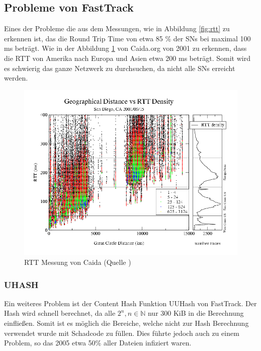 
\subsection{Probleme von FastTrack}
\label{subsec:probT}

Eines der Probleme die aus dem Messungen, wie in Abbildung \ref{fig:rtt} zu erkennen ist, das die Round Trip Time von etwa 85 \% der SNs bei maximal 100 ms beträgt.
Wie in der Abbildung \ref{fig:rttcaida} von Caida.org von 2001 \cite{caida} zu erkennen, dass die RTT von Amerika nach Europa und Asien etwa 200 ms beträgt.
Somit wird es schwierig das ganze Netzwerk zu durchsuchen, da nicht alle SNs erreicht werden.

\begin{figure}
\includegraphics[scale=0.3]{gfx/dist_density_rie_20010513}
\caption{RTT Messung von Caida (Quelle \cite{caida})}
\label{fig:rttcaida}
\end{figure}


\subsubsection{UHASH}
\label{subsubsec:uhash}

Ein weiteres Problem ist der Content Hash Funktion UUHash \cite{uuHash} von FastTrack.
Der Hash wird schnell berechnet, da alle $2^n, n \in \mathbb{N}$ nur 300 KiB in die Berechnung einfließen.
Somit ist es möglich die Bereiche, welche nicht zur Hash Berechnung verwendet wurde mit Schadcode zu füllen.
Dies führte jedoch auch zu einem Problem, so das 2005 etwa 50\% aller Dateien infiziert waren. \cite{menneck2} 


